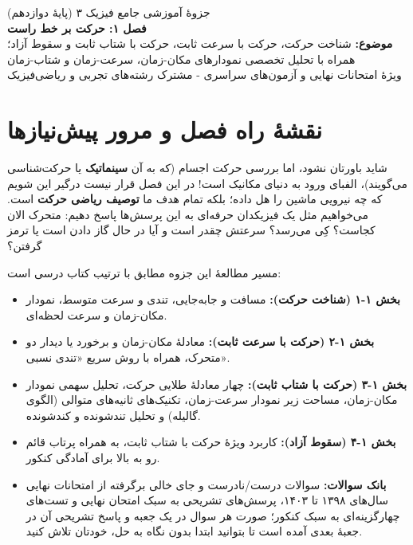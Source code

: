 \documentclass[12pt, a4paper]{article}
\begin{document}
\begin{center}
    \begin{tcolorbox}[colback=blue!6!white, colframe=blue!75!black, halign=center, arc=3.5mm]
        \vspace{0.1cm}
        {\LARGE \titrfont جزوهٔ آموزشی جامع فیزیک ۳ (پایهٔ دوازدهم)}\\[0.3cm]
        {\Large \titlefont \bfseries فصل ۱: حرکت بر خط راست}\\[0.15cm]
        {\normalsize \textbf{موضوع:} شناخت حرکت، حرکت با سرعت ثابت، حرکت با شتاب ثابت و سقوط آزاد؛ همراه با تحلیل تخصصی نمودارهای مکان-زمان، سرعت-زمان و شتاب-زمان}\\[0.1cm]
        {\small ویژهٔ امتحانات نهایی و آزمون‌های سراسری - مشترک رشته‌های تجربی و ریاضی‌فیزیک}
        \vspace{0.1cm}
    \end{tcolorbox}
\end{center}

\vspace{0.2cm}

\section{نقشهٔ راه فصل و مرور پیش‌نیازها}

شاید باورتان نشود، اما بررسی حرکت اجسام (که به آن \textbf{سینماتیک} یا حرکت‌شناسی می‌گویند)، الفبای ورود به دنیای مکانیک است! در این فصل قرار نیست درگیر این شویم که چه نیرویی ماشین را هل داده؛ بلکه تمام هدف ما \textbf{توصیف ریاضی حرکت} است. می‌خواهیم مثل یک فیزیکدان حرفه‌ای به این پرسش‌ها پاسخ دهیم: متحرک الان کجاست؟ کِی می‌رسد؟ سرعتش چقدر است و آیا در حال گاز دادن است یا ترمز گرفتن؟

مسیر مطالعهٔ این جزوه مطابق با ترتیب کتاب درسی است:
\begin{itemize}
    \item \textbf{بخش ۱-۱ (شناخت حرکت):} مسافت و جابه‌جایی، تندی و سرعت متوسط، نمودار مکان-زمان و سرعت لحظه‌ای.
    \item \textbf{بخش ۱-۲ (حرکت با سرعت ثابت):} معادلهٔ مکان-زمان و برخورد یا دیدار دو متحرک، همراه با روش سریع «تندی نسبی».
    \item \textbf{بخش ۱-۳ (حرکت با شتاب ثابت):} چهار معادلهٔ طلایی حرکت، تحلیل سهمی نمودار مکان-زمان، مساحت زیر نمودار سرعت-زمان، تکنیک‌های ثانیه‌های متوالی (الگوی گالیله) و تحلیل تندشونده و کندشونده.
    \item \textbf{بخش ۱-۴ (سقوط آزاد):} کاربرد ویژهٔ حرکت با شتاب ثابت، به همراه پرتاب قائم رو به بالا برای آمادگی کنکور.
    \item \textbf{بانک سوالات:} سوالات درست/نادرست و جای خالی برگرفته از امتحانات نهایی سال‌های ۱۳۹۸ تا ۱۴۰۳، پرسش‌های تشریحی به سبک امتحان نهایی و تست‌های چهارگزینه‌ای به سبک کنکور؛ صورت هر سوال در یک جعبه و پاسخ تشریحی آن در جعبهٔ بعدی آمده است تا بتوانید ابتدا بدون نگاه به حل، خودتان تلاش کنید.
\end{itemize}
\end{document}
